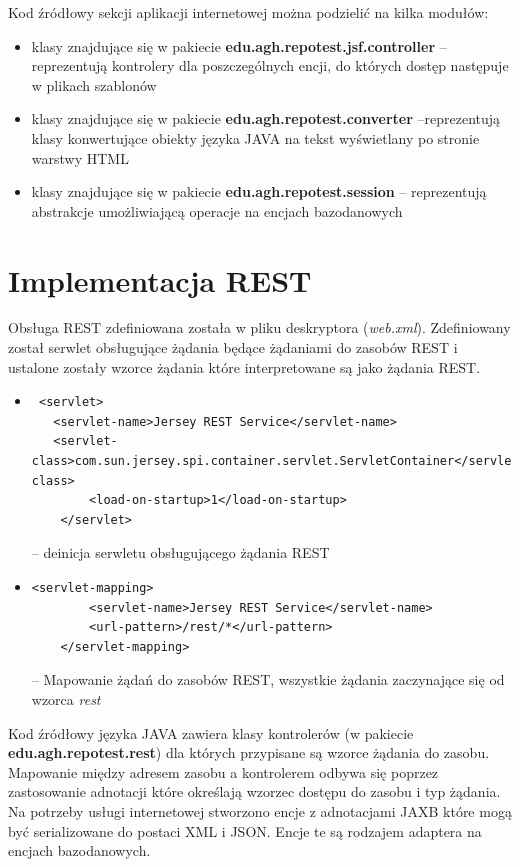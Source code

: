 Kod źródłowy sekcji aplikacji internetowej można podzielić na kilka modułów:
\begin{itemize}
  \item klasy znajdujące się w pakiecie \textbf{edu.agh.repotest.jsf.controller} -- reprezentują kontrolery dla poszczególnych encji, do których dostęp następuje w plikach szablonów
  \item klasy znajdujące się w pakiecie \textbf{edu.agh.repotest.converter} --reprezentują klasy konwertujące obiekty języka JAVA na tekst wyświetlany po stronie warstwy HTML
  \item klasy znajdujące się w pakiecie \textbf{edu.agh.repotest.session} -- reprezentują abstrakcje umożliwiającą operacje na encjach bazodanowych
   
\end{itemize}


\section{Implementacja REST}

Obsługa REST zdefiniowana została w pliku deskryptora (\textit{web.xml}). Zdefiniowany został serwlet obsługujące żądania będące żądaniami do zasobów REST i ustalone zostały wzorce żądania które interpretowane są jako żądania REST. 
\begin{itemize}
	\item  {\footnotesize \begin{verbatim} <servlet>
   <servlet-name>Jersey REST Service</servlet-name>
   <servlet-class>com.sun.jersey.spi.container.servlet.ServletContainer</servlet-class>
        <load-on-startup>1</load-on-startup>
    </servlet> \end{verbatim}} -- deinicja serwletu obsługującego żądania REST
 	\item  {\footnotesize \begin{verbatim}<servlet-mapping>
        <servlet-name>Jersey REST Service</servlet-name>
        <url-pattern>/rest/*</url-pattern>
    </servlet-mapping>\end{verbatim}} -- Mapowanie żądań do zasobów REST, wszystkie żądania zaczynające się od wzorca \textit{rest}
  \end{itemize}
  
  
  Kod źródłowy języka JAVA zawiera klasy kontrolerów (w pakiecie \textbf{edu.agh.repotest.rest}) dla których przypisane są wzorce żądania do zasobu. Mapowanie między adresem zasobu a kontrolerem odbywa się poprzez zastosowanie adnotacji które określają wzorzec dostępu do zasobu i typ żądania. Na potrzeby usługi internetowej stworzono encje z adnotacjami JAXB które mogą być serializowane do postaci XML i JSON. Encje te są rodzajem adaptera na encjach bazodanowych.
  \newpage
  
